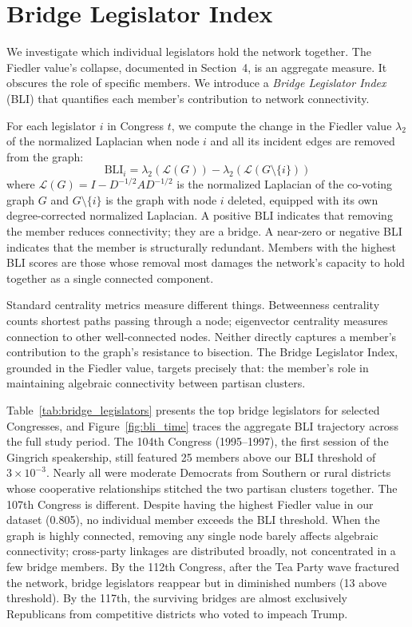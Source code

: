 \documentclass[12pt, a4paper]{article}
\begin{document}
\section{Bridge Legislator Index}\label{sec:bli}

We investigate which individual legislators hold the network together. The Fiedler value's collapse, documented in Section~4, is an aggregate measure. It obscures the role of specific members. We introduce a \textit{Bridge Legislator Index} (BLI) that quantifies each member's contribution to network connectivity.

For each legislator $i$ in Congress $t$, we compute the change in the Fiedler value $\lambda_2$ of the normalized Laplacian when node $i$ and all its incident edges are removed from the graph:
\begin{equation}
    \text{BLI}_i = \lambda_2(\mathcal{L}(G)) - \lambda_2(\mathcal{L}(G \setminus \{i\}))
\end{equation}
where $\mathcal{L}(G) = I - D^{-1/2} A D^{-1/2}$ is the normalized Laplacian of the co-voting graph $G$ and $G \setminus \{i\}$ is the graph with node $i$ deleted, equipped with its own degree-corrected normalized Laplacian. A positive BLI indicates that removing the member reduces connectivity; they are a bridge. A near-zero or negative BLI indicates that the member is structurally redundant. Members with the highest BLI scores are those whose removal most damages the network's capacity to hold together as a single connected component.

Standard centrality metrics measure different things. Betweenness centrality counts shortest paths passing through a node; eigenvector centrality measures connection to other well-connected nodes. Neither directly captures a member's contribution to the graph's resistance to bisection. The Bridge Legislator Index, grounded in the Fiedler value, targets precisely that: the member's role in maintaining algebraic connectivity between partisan clusters.

Table~\ref{tab:bridge_legislators} presents the top bridge legislators for selected Congresses, and Figure~\ref{fig:bli_time} traces the aggregate BLI trajectory across the full study period. The 104th Congress (1995--1997), the first session of the Gingrich speakership, still featured 25 members above our BLI threshold of $3 \times 10^{-3}$. Nearly all were moderate Democrats from Southern or rural districts whose cooperative relationships stitched the two partisan clusters together. The 107th Congress is different. Despite having the highest Fiedler value in our dataset (0.805), no individual member exceeds the BLI threshold. When the graph is highly connected, removing any single node barely affects algebraic connectivity; cross-party linkages are distributed broadly, not concentrated in a few bridge members. By the 112th Congress, after the Tea Party wave fractured the network, bridge legislators reappear but in diminished numbers (13 above threshold). By the 117th, the surviving bridges are almost exclusively Republicans from competitive districts who voted to impeach Trump.
\end{document}
